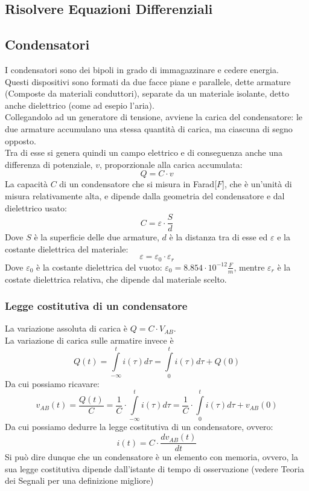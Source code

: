 \documentclass[../main.tex]{subfiles}
\begin{document}
	\subsection{Risolvere Equazioni Differenziali}
	\subsection{Condensatori}
	I condensatori sono dei bipoli in grado di immagazzinare e cedere energia.\\
	Questi dispositivi sono formati da due facce piane e parallele, dette armature (Composte da materiali conduttori), separate da un materiale isolante, detto anche dielettrico (come ad esepio l'aria).\\
	Collegandolo ad un generatore di tensione, avviene la carica del condensatore: le due armature accumulano una stessa quantità di carica, ma ciascuna di segno opposto.\\
	Tra di esse si genera quindi un campo elettrico e di conseguenza anche una differenza di potenziale, $v$, proporzionale alla carica accumulata:
	\[Q = C \cdot v\]
	La capacità $C$ di un condensatore che si misura in Farad[$F$], che è un’unità di misura relativamente alta, e dipende dalla geometria del condensatore e dal dielettrico usato:
	\[C = \varepsilon \cdot \frac{S}{d}\]
	Dove $S$ è la superficie delle due armature, $d$ è la distanza tra di esse ed $\varepsilon$ e la costante dielettrica del materiale:
	\[\varepsilon = \varepsilon_0 \cdot \varepsilon_r\]
	Dove $\varepsilon_0$ è la costante dielettrica del vuoto:  $\varepsilon_0 = 8.854 \cdot 10^{-12} \frac{F}{m}$, mentre $\varepsilon_r$ è la costate dielettrica relativa, che dipende dal materiale scelto.
	\subsubsection{Legge costitutiva di un condensatore}
	La variazione assoluta di carica è $Q = C \cdot V_{AB}$.\\
	La variazione di carica sulle armatire invece è
	\[Q(t) = \int\limits_{-\infty}^{t} i(\tau) d\tau = \int\limits_{0}^{t} i(\tau) d\tau + Q(0)\]
	Da cui possiamo ricavare:
	\[ v_{AB} (t) = \frac{Q(t)}{C} = \frac{1}{C} \cdot \int\limits_{-\infty}^{t} i(\tau) d\tau = \frac{1}{C} \cdot \int\limits_{0}^{t} i(\tau) d\tau + v_{AB}(0)\]
	Da cui possiamo dedurre la legge costitutiva di un condensatore, ovvero:
	\[i(t) = C \cdot \frac{d v_{AB}(t)}{dt}\]
	Si può dire dunque che un condensatore è un elemento con memoria, ovvero, la sua legge costitutiva dipende dall'istante di tempo di osservazione (vedere Teoria dei Segnali per una definizione migliore)
\end{document}

